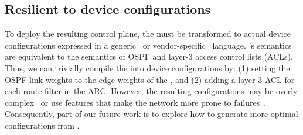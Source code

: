 \subsection{Resilient \ARCs to device configurations}
To deploy the resulting control plane, the \ARC must be
transformed to actual device configurations expressed in a
generic~\cite{openconfig} or vendor-specific~\cite{ciscoios} language. \ARC's
semantics are equivalent to the semantics of OSPF and layer-3 access control
lists (ACLs). Thus, we can trivially compile the \ARC into device
configurations by: (1) setting the OSPF link weights to the edge weights of
the \ARC, and (2) adding a layer-3 ACL for each route-filter in the ARC.
However, the resulting configurations may be overly
complex~\cite{complexitymetrics} or use features that make the network more
prone to failures~\cite{mpa-imc15}. Consequently, part of our future work is to
explore how to generate more optimal configurations from \ARCs.

%
